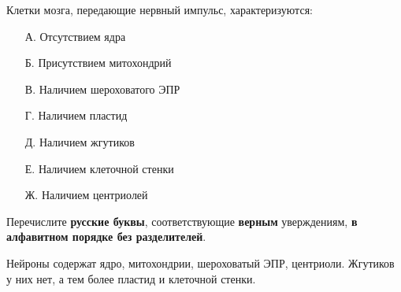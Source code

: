 
Клетки мозга, передающие нервный импульс, характеризуются:
\begin{enumerate}
    \item[А.] Отсутствием ядра
    \item[Б.] Присутствием митохондрий
    \item[В.] Наличием шероховатого ЭПР
    \item[Г.] Наличием пластид
    \item[Д.] Наличием жгутиков
    \item[Е.] Наличием клеточной стенки
    \item[Ж.] Наличием центриолей
\end{enumerate} 

Перечислите \textbf{русские буквы}, соответствующие \textbf{верным} уверждениям, \textbf{в алфавитном порядке без разделителей}.

\explanationSection

Нейроны содержат ядро, митохондрии, шероховатый ЭПР, центриоли. Жгутиков у них нет, а тем более пластид и клеточной стенки.

